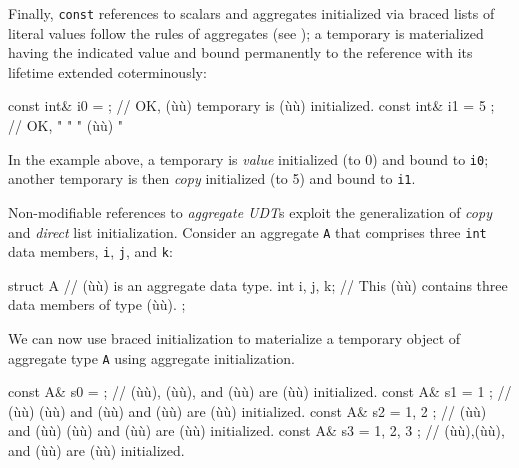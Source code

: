 Finally, \lstinline!const!  references to scalars and
aggregates initialized via braced lists of literal values follow the
rules of aggregates (see ); a temporary is materialized having the indicated value and bound
permanently to the reference with its lifetime extended coterminously:

\begin{emcppslisting}
const int& i0 = { };    // OK, (ù{}ù) temporary is (ù{}ù) initialized.
const int& i1 = { 5 };  // OK,       "           "       " (ù{}ù)      "
\end{emcppslisting}
    

\noindent In the example above, a temporary is \emph{value} initialized (to 0) and
bound to \lstinline!i0!; another temporary is then \emph{copy} initialized
(to 5) and bound to \lstinline!i1!.

Non-modifiable references to \emph{aggregate UDT}s exploit the
generalization of \emph{copy} and \emph{direct} list initialization.
Consider an aggregate \lstinline!A! that comprises three \lstinline!int! data
members, \lstinline!i!, \lstinline!j!, and \lstinline!k!:

\begin{emcppslisting}[emcppsbatch=e11]
struct A          // (ù{}ù) is an aggregate data type.
{
    int i, j, k;  // This (ù{}ù) contains three data members of type (ù{}ù).
};
\end{emcppslisting}
    

\noindent We can now use braced initialization to materialize a temporary object
of aggregate type \lstinline!A! using aggregate initialization.

\begin{emcppslisting}[emcppsbatch=e11]
const A& s0 = { };           // (ù{}ù), (ù{}ù), and (ù{}ù) are  (ù{}ù) initialized.
const A& s1 = { 1 };         // (ù{}ù) (ù{}ù) and (ù{}ù) and (ù{}ù) are (ù{}ù) initialized.
const A& s2 = { 1, 2 };      // (ù{}ù) and (ù{}ù) (ù{}ù) and (ù{}ù) are (ù{}ù) initialized.
const A& s3 = { 1, 2, 3 };   // (ù{}ù),(ù{}ù), and (ù{}ù) are (ù{}ù) initialized.
\end{emcppslisting}
    

